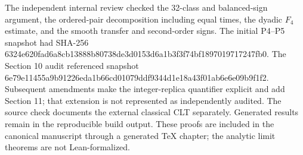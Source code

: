 The independent internal review checked the 32-class and balanced-sign
argument, the ordered-pair decomposition including equal times, the
dyadic \(F_4\) estimate, and the smooth transfer and second-order signs.
The initial P4--P5 snapshot had SHA-256
6324e620fad6a8cb13888b80738de3d0153d6a1b3f3f74bf1897019717247fb0.
The Section 10 audit referenced snapshot
6e79e11455a9b91226eda1b66cd01079ddf9344d1e18a43f01ab6e6e09b9f1f2.
Subsequent amendments make the integer-replica quantifier explicit and
add Section 11; that extension is not represented as independently audited.
The source check documents the external classical CLT separately.
Generated results remain in the reproducible build output. These proofs are
included in the canonical manuscript through a generated TeX chapter; the
analytic limit theorems are not Lean-formalized.
